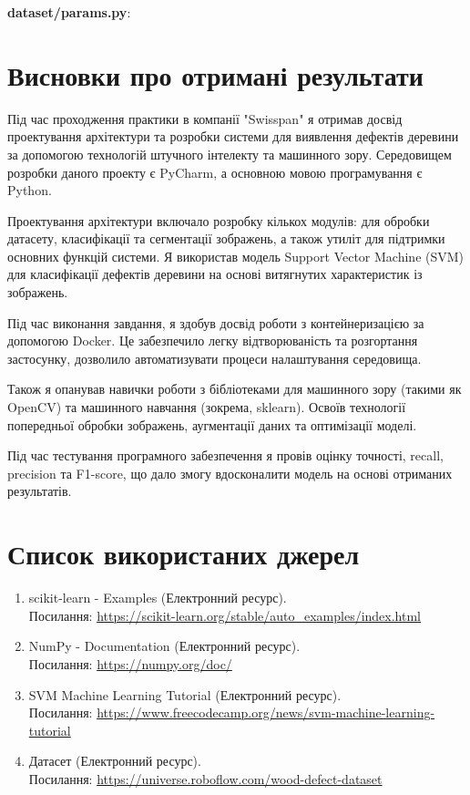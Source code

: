 \documentclass[oneside,14pt]{extarticle}
\begin{document}
\textbf{dataset/params.py}:
{\small}

\section*{Висновки про отримані результати}

Під час проходження практики в компанії "Swisspan" я отримав досвід проектування архітектури та розробки системи для виявлення дефектів деревини за допомогою технологій штучного інтелекту та машинного зору. Середовищем розробки даного проекту є PyCharm, а основною мовою програмування є Python.

Проектування архітектури включало розробку кількох модулів: для обробки датасету, класифікації та сегментації зображень, а також утиліт для підтримки основних функцій системи. Я використав модель Support Vector Machine (SVM) для класифікації дефектів деревини на основі витягнутих характеристик із зображень.

Під час виконання завдання, я здобув досвід роботи з контейнеризацією за допомогою Docker. Це забезпечило легку відтворюваність та розгортання застосунку, дозволило автоматизувати процеси налаштування середовища.

Також я опанував навички роботи з бібліотеками для машинного зору (такими як OpenCV) та машинного навчання (зокрема, sklearn). Освоїв технології попередньої обробки зображень, аугментації даних та оптимізації моделі.

Під час тестування програмного забезпечення я провів оцінку точності, recall, precision та F1-score, що дало змогу вдосконалити модель на основі отриманих результатів.

\section*{Список використаних джерел}

\begin{enumerate}
	\item scikit-learn - Examples (Електронний ресурс). \\Посилання: \href{https://scikit-learn.org/stable/auto_examples/index.html}{https://scikit-learn.org/stable/auto\_examples/index.html}
	\item NumPy - Documentation (Електронний ресурс). \\Посилання: \href{https://numpy.org/doc/}{https://numpy.org/doc/}
	\item SVM Machine Learning Tutorial (Електронний ресурс). \\Посилання: \href{https://www.freecodecamp.org/news/svm-machine-learning-tutorial-what-is-the-support-vector-machine-algorithm-explained-with-code-examples/}{https://www.freecodecamp.org/news/svm-machine-learning-tutorial}
	\item Датасет (Електронний ресурс). \\Посилання: \href{https://universe.roboflow.com/wood-defect-dataset}{https://universe.roboflow.com/wood-defect-dataset}
\end{enumerate}
\end{document}
